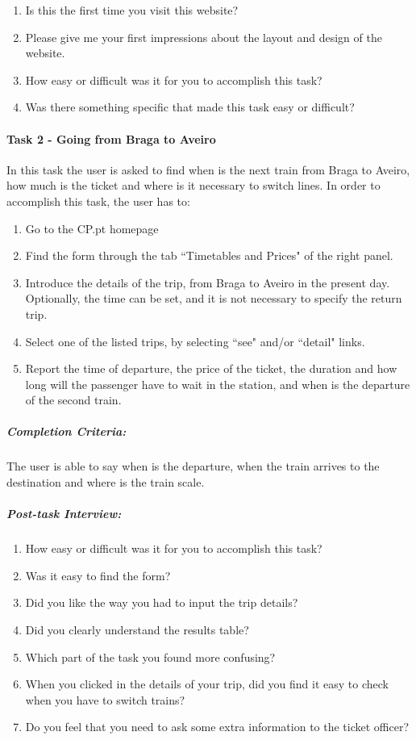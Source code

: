 \documentclass[a4paper]{article}
\begin{document}
\begin{enumerate}[label=1.\theenumi .]
  \item Is this the first time you visit this website?
  \item Please give me your first impressions about the layout and design of the website.
  \item How easy or difficult was it for you to accomplish this task?
  \item Was there something specific that made this task easy or difficult?
\end{enumerate}

\paragraph{Task 2 - Going from Braga to Aveiro} In this task the user is asked to find when is the next train from Braga to Aveiro, how much is the ticket and where is it necessary to switch lines. In order to accomplish this task, the user has to:

\begin{enumerate}[label=\roman*.]
  \item Go to the CP.pt homepage
  \item Find the form through the tab ``Timetables and Prices" of the right panel.
  \item Introduce the details of the trip, from Braga to Aveiro in the present day. Optionally, the time can be set, and it is not necessary to specify the return trip.
  \item Select one of the listed trips, by selecting ``see" and/or ``detail" links. 
  \item Report the time of departure, the price of the ticket, the duration and how long will the passenger have to wait in the station, and when is the departure of the second train.
\end{enumerate}

\subparagraph{Completion Criteria:} The user is able to say when is the departure, when the train arrives to the destination and where is the train scale.

\subparagraph{Post-task Interview:}

\begin{enumerate}[label=2.\theenumi .]
  \item How easy or difficult was it for you to accomplish this task?
  \item Was it easy to find the form?
  \item Did you like the way you had to input the trip details?
  \item Did you clearly understand the results table?
  \item Which part of the task you found more confusing?
  \item When you clicked in the details of your trip, did you find it easy to check when you have to switch trains?
   \item Do you feel that you need to ask some extra information to the ticket officer?
\end{enumerate}
\end{document}
